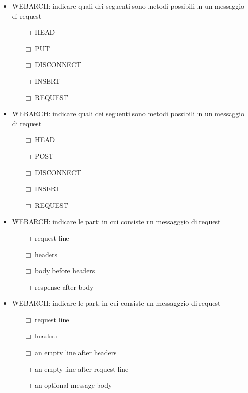 \documentclass[10pt,twocolumn]{article}
\begin{document}
\begin{itemize}
    \item WEBARCH: indicare quali dei seguenti sono metodi possibili in un messaggio di request
          \begin{itemize}
              \item[$\Box$] HEAD
              \item[$\Box$] PUT
              \item[$\Box$] DISCONNECT
              \item[$\Box$] INSERT
              \item[$\Box$] REQUEST
          \end{itemize}
\end{itemize}
\begin{itemize}
    \item WEBARCH: indicare quali dei seguenti sono metodi possibili in un messaggio di request
          \begin{itemize}
              \item[$\Box$] HEAD
              \item[$\Box$] POST
              \item[$\Box$] DISCONNECT
              \item[$\Box$] INSERT
              \item[$\Box$] REQUEST
          \end{itemize}
\end{itemize}
\begin{itemize}
    \item WEBARCH: indicare le parti in cui consiste un messagggio di request
          \begin{itemize}
              \item[$\Box$] request line
              \item[$\Box$] headers
              \item[$\Box$] body before headers
              \item[$\Box$] response after body
          \end{itemize}
\end{itemize}
\begin{itemize}
    \item WEBARCH: indicare le parti in cui consiste un messagggio di request
          \begin{itemize}
              \item[$\Box$] request line
              \item[$\Box$] headers
              \item[$\Box$] an empty line after headers
              \item[$\Box$] an empty line after request line
              \item[$\Box$] an optional message body
          \end{itemize}
\end{itemize}
\end{document}

